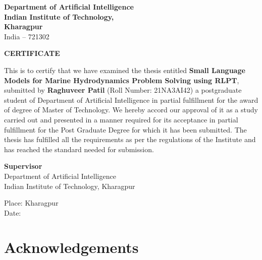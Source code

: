 \documentclass[12pt]{report}
\begin{document}
\newpage
\thispagestyle{plain}
\begin{center}
{\large \textbf{Department of Artificial Intelligence}}\\
{\large \textbf{Indian Institute of Technology,}}\\
{\large \textbf{Kharagpur}}\\
{\large India -- 721302}
\end{center}

\vspace{1.5cm}

\begin{center}
{\Large \textbf{CERTIFICATE}}
\end{center}

\vspace{1cm}

This is to certify that we have examined the thesis entitled \textbf{Small Language Models for Marine Hydrodynamics Problem Solving using RLPT}, submitted by \textbf{Raghuveer Patil} (Roll Number: 21NA3AI42) a postgraduate student of Department of Artificial Intelligence in partial fulfillment for the award of degree of Master of Technology. We hereby accord our approval of it as a study carried out and presented in a manner required for its acceptance in partial fulfillment for the Post Graduate Degree for which it has been submitted. The thesis has fulfilled all the requirements as per the regulations of the Institute and has reached the standard needed for submission.

\vspace{3cm}

\noindent
\textbf{Supervisor}\\
Department of Artificial Intelligence\\
Indian Institute of Technology, Kharagpur

\vspace{1.5cm}

\noindent
Place: Kharagpur\\
Date:

\clearpage

\chapter*{Acknowledgements}
\end{document}
